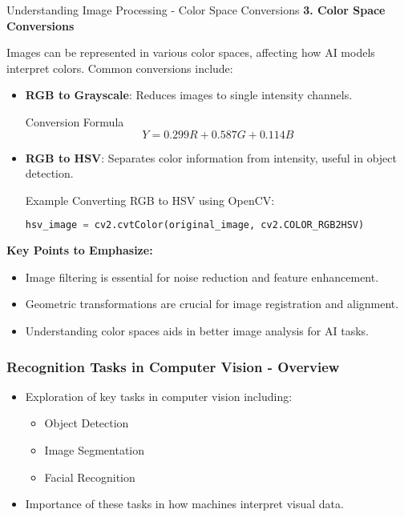 \documentclass[aspectratio=169]{beamer}
\begin{document}
\begin{frame}[fragile]{Understanding Image Processing - Color Space Conversions}
    \textbf{3. Color Space Conversions}
    
    Images can be represented in various color spaces, affecting how AI models interpret colors. Common conversions include:
    
    \begin{itemize}
        \item \textbf{RGB to Grayscale}: Reduces images to single intensity channels.
        \begin{block}{Conversion Formula}
            \begin{equation}
                Y = 0.299R + 0.587G + 0.114B
            \end{equation}
        \end{block}
        
        \item \textbf{RGB to HSV}: Separates color information from intensity, useful in object detection.
        \begin{block}{Example}
            Converting RGB to HSV using OpenCV:
            \begin{lstlisting}[language=Python]
hsv_image = cv2.cvtColor(original_image, cv2.COLOR_RGB2HSV)
            \end{lstlisting}
        \end{block}
    \end{itemize}
    
    \textbf{Key Points to Emphasize:}
    \begin{itemize}
        \item Image filtering is essential for noise reduction and feature enhancement.
        \item Geometric transformations are crucial for image registration and alignment.
        \item Understanding color spaces aids in better image analysis for AI tasks.
    \end{itemize}
\end{frame}

\begin{frame}[fragile]
    \frametitle{Recognition Tasks in Computer Vision - Overview}
    \begin{itemize}
        \item Exploration of key tasks in computer vision including:
        \begin{itemize}
            \item Object Detection
            \item Image Segmentation
            \item Facial Recognition
        \end{itemize}
        \item Importance of these tasks in how machines interpret visual data.
    \end{itemize}
\end{frame}
\end{document}
